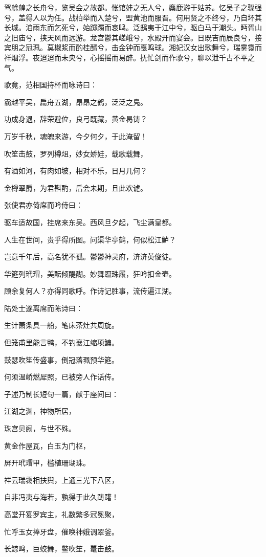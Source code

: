 \documentclass[a4paper,12pt,UTF8,twoside]{ctexbook}
\begin{document}
驾艅艎之长舟兮，览吴会之故都。怅馆娃之无人兮，麋鹿游于姑苏。忆吴子之骤强兮，盖得人以为任。战柏举而入楚兮，盟黄池而服晋。何用贤之不终兮，乃自坏其长城。洎雨东而乞死兮，始踯躅而哀鸣。泛鸱夷于江中兮，驱白马于潮头。眄胥山之旧庙兮，挟天风而远游。龙宫鬱其嵯峨兮，水殿开而宴会。日既吉而辰良兮，接宾朋之冠珮。莫椒浆而酌桂醑兮，击金钟而戛鸣球。湘妃汉女出歌舞兮，瑞雾霭而祥烟浮。夜迢迢而未央兮，心摇摇而易醉。抚忙剑而作歌兮，聊以泄千古不平之气。

歌竟，范相国持杯而咏诗曰：

霸越平吴，扁舟五湖，昂昂之鹤，泛泛之鳬。

功成身退，辞荣避位，良弓既藏，黄金曷铸？

万岁千秋，魂魄来游，今夕何夕，于此淹留！

吹笙击鼓，罗列樽俎，妙女娇娃，载歌载舞，

有酒如河，有肉如坡，相对不乐，日月几何？

金樽翠爵，为君斟酌，后会未期，且此欢谑。

张使君亦倚席而吟侍曰：

驱车适故国，挂席来东吴。西风旦夕起，飞尘满皇都。

人生在世间，贵乎得所图。问渠华亭鹤，何似松江鲈？

岂意千年后，高名犹不孤。鬱鬱神灵府，济济英俊徒。

华筵列玳瑁，美酝倾醍醐。妙舞蹑珠履，狂吟扣金壶。

顾余复何人？亦得同歌呼。作诗记胜事，流传遍江湖。

陆处士遂离席而陈诗曰：

生计萧条具一船，笔床茶灶共周旋。

但笼甫里能言鸭，不钓襄江缩项鳊。

鼓瑟吹笙传盛事，倒冠落珮预华筵。

何须温峤燃犀照，已被旁人作话传。

子述乃制长短句一篇，献于座间曰：

江湖之渊，神物所居，

珠宫贝阙，与世不殊。

黄金作屋瓦，白玉为门枢，

屏开玳瑁甲，槛植珊瑚珠。

祥云瑞霭相扶舆，上通三光下八区，

自非冯夷与海若，孰得于此久踌躇！

高堂开宴罗宾主，礼数繁多冠冕聚，

忙呼玉女捧牙盘，催唤神娥调翠釜。

长鲸鸣，巨蛟舞，鳖吹笙，鼍击鼓。
\end{document}
